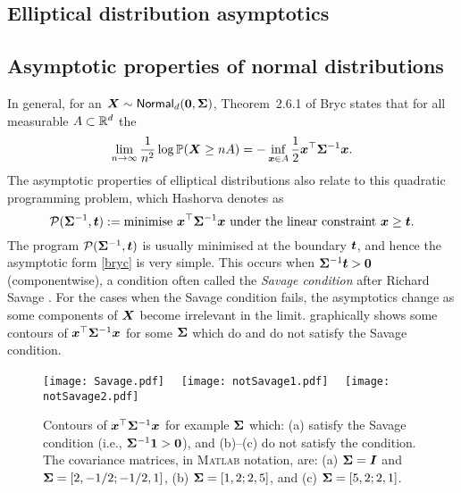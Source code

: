 \begin{subappendices}
\section{Elliptical distribution asymptotics} \label{scn:elliptical_asymptotics}

\subsection{Asymptotic properties of normal distributions}

In general, for an $\bm{X} \sim \mathsf{Normal}_d(\bm{0},\bm{\Sigma})$, Theorem~2.6.1 of Bryc \cite{bryc2012normal} states that for all measurable $A \subset \mathbb{R}^d$ the
\begin{equation} \label{bryc}
\lim_{n \to \infty} \frac1{n^2} \log \operatorname{{\mathbb P}}(\bm{X} \ge nA) = - \inf_{\bm{x} \in A} \frac12 \bm{x}^\top \bm{\Sigma}^{-1} \bm{x}.
\end{equation}
The asymptotic properties of elliptical distributions also relate to this quadratic programming problem, which Hashorva \cite{hashorva2005asymptotics,hashorva2007asymptotic} denotes as
\begin{equation} \label{quad_prog}
\mathcal{P}(\bm{\Sigma}^{-1}, \bm{t}) := \text{minimise } \bm{x}^\top \bm{\Sigma}^{-1} \bm{x} \text{ under the linear constraint } \bm{x} \ge \bm{t}.
\end{equation}
The program $\mathcal{P}(\bm{\Sigma}^{-1}, \bm{t})$ is usually minimised at the boundary $\bm{t}$, and hence the asymptotic form \eqref{bryc} is very simple. This occurs when
$\bm{\Sigma}^{-1} \bm{t} > \bm{0}$ (componentwise), a condition often called the \emph{Savage condition} after Richard Savage \cite{savage1962mills}. For the cases when the Savage condition fails, the asymptotics change as some components of $\bm{X}$ become irrelevant in the limit.  graphically shows some contours of $\bm{x}^\top \bm{\Sigma}^{-1} \bm{x}$ for some $\bm{\Sigma}$ which do and do not satisfy the Savage condition.

\begin{figure}[H]
\centering
\texttt{[image: Savage.pdf]}~~
\texttt{[image: notSavage1.pdf]}~~
\texttt{[image: notSavage2.pdf]}
\caption{Contours of $\bm{x}^\top \bm{\Sigma}^{-1} \bm{x}$ for example $\bm{\Sigma}$ which: (a) satisfy the Savage condition (i.e., $\bm{\Sigma}^{-1} \bm{1} > \bm{0}$), and (b)--(c) do not satisfy the condition. The covariance matrices, in \textsc{Matlab} notation, are: (a) $\bm{\Sigma} = \bm{I}$ and  $\bm{\Sigma} =[2, -1/2; -1/2, 1]$, (b) $\bm{\Sigma} = [1, 2; 2, 5]$, and (c) $\bm{\Sigma} = [5, 2; 2, 1]$.}
\label{fig:savage_condition}
\end{figure}


\end{subappendices}
